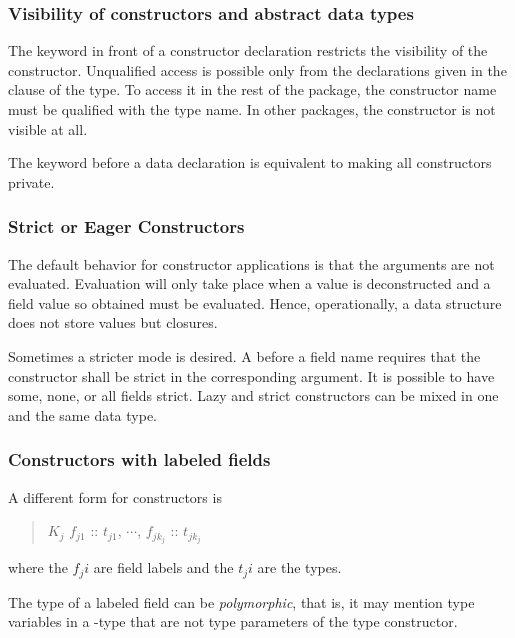\subsubsection{Visibility of constructors and abstract data types}

The keyword  in front of a constructor declaration restricts the visibility of the constructor. Unqualified access is possible only from the declarations given in the  clause of the type. To access it in the rest of the package, the constructor name must be qualified with the type name. In other packages, the constructor is not visible at all.

The keyword  before a data declaration is equivalent to making all constructors private.

\subsubsection{Strict or Eager Constructors}

The default behavior for constructor applications is that the arguments are not evaluated. Evaluation will only take place when a value is deconstructed and a field value so obtained must be evaluated. Hence, operationally, a data structure does not store values but closures.

Sometimes a stricter mode is desired. A \sym{!} before a field name requires that the constructor shall be strict in the corresponding argument. It is possible to have some, none, or all fields strict. Lazy and strict constructors can be mixed in one and the same data type.

\subsubsection{Constructors with labeled fields} \label{fieldconstructor}

A different form for constructors is

\begin{quote}
$K_j$ \bracea{} $f_{j1}$ :: $t_{j1}$, $\cdots$, $f_{j{k_j}}$ :: $t_{j{k_j}}$ \bracez{}
\end{quote}

where the $f_ji$ are field labels and the $t_ji$ are the types.

\label{polyrf} The type of a labeled field can be \emph{polymorphic}, that is, it may mention type variables in a -type that are not type parameters of the type constructor.

